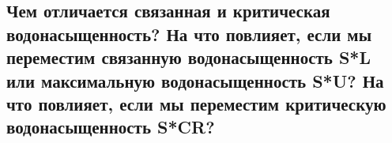 

\subsection{Чем отличается связанная и критическая водонасыщенность? На что повлияет, если мы переместим связанную водонасыщенность S*L или максимальную водонасыщенность S*U? На что повлияет, если мы переместим критическую водонасыщенность S*CR?}

